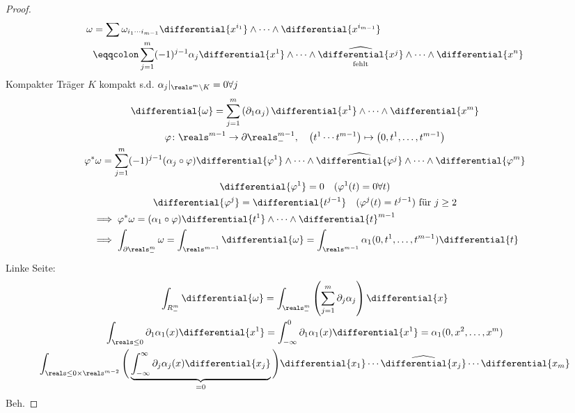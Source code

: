 \begin{proof}
  \begin{align*}
      \omega &= \sum \omega_{i_1\cdots i_{m-1}}\differential{x^{i_1}}\wedge\dotsb \wedge\differential{x^{i_{m-1}}}\\
      &\eqqcolon \sum_{j=1}^{m}(-1)^{j-1}\alpha_j\differential{x^1}\wedge\dotsb \wedge \underset{\text{fehlt}}{\widehat{\differential{x^j}}}\wedge\dotsb\wedge\differential{x^n}
  \end{align*}
  Kompakter Träger \timplies \texists $K$ kompakt s.d. \( \alpha_j|_{\reals^m\setminus K}=0 \forall j \)
  \begin{gather*}
      \differential{\omega}=\sum_{j=1}^{m}\left( \partial_1\alpha_j \right)\differential{x^1}\wedge\dotsb \wedge\differential{x^m}\\
      \varphi\colon \reals^{m-1}\to \partial\reals_-^{m-1},\quad \left( t^1\dotsm t^{m-1} \right) \mapsto \left( 0,t^1,\dotsc ,t^{m-1} \right)\\
      \varphi^*\omega=\sum_{j=1}^{m}(-1)^{j-1}(\alpha_j\circ\varphi)\differential{\varphi^1}\wedge\dotsb \wedge\widehat{\differential{\varphi^j}}\wedge\dotsb \wedge\differential{\varphi^m}\\
      \differential{\varphi^1}=0\quad (\varphi^1(t)=0 \forall t)\\
      \differential{\varphi^j}=\differential{t^{j-1}}\quad (\varphi^j(t)=t^{j-1})\text{ für }j\ge 2\\
      \begin{aligned}[t]
          &\implies \varphi^*\omega=(\alpha_1\circ\varphi)\differential{t^1}\wedge \dotsb \wedge \differential{t}^{m-1}\\
          &\implies \int_{\partial\reals_-^m}\omega=\int_{\reals^{m-1}}\differential{\omega}=\int_{\reals^{m-1}}\alpha_1(0,t^1,\dotsc ,t^{m-1})\differential{t}
      \end{aligned}
  \end{gather*}
  Linke Seite:
  \begin{gather*}
      \int_{R_-^m}\differential{\omega}=\int_{\reals_-^m}\left( \sum_{j=1}^{m}\partial_j\alpha_j \right)\differential{x}\\
      \int_{\reals\le 0}\partial_1\alpha_1(x)\differential{x^1}=\int_{-\infty}^{0}\partial_1\alpha_1(x)\differential{x^1}=\alpha_1(0,x^2,\dotsc ,x^m)\\
      \int_{\reals\le 0\times \reals^{m-2}}\Bigg(
      \underbrace{\int_{-\infty}^{\infty}\partial_j\alpha_j(x)\differential{x_j}}_{=0}    
      \Bigg)\differential{x_1}\dotsb \widehat{\differential{x_j}}\dotsb \differential{x_m}
  \end{gather*}
  \timplies Beh.
\end{proof}

